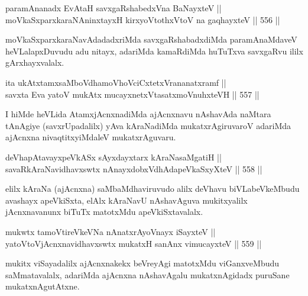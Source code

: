 \begin{shl}
paramAnanadx EvAtaH savxgaRshabedxVna BaNayxteV || \\
moVkaSxparxkaraNAninxtayxH kirxyoVtothxV\s toV na gaqhayxteV \hfill || 556 ||  
\end{shl}	

\begin{artha}
moVkaSxparxkaraNavAdadadxriMda savxgaRshabadxdiMda paramAnaMdaveV\break
heVLalapxDuvudu adu nitayx, adariMda kamaRdiMda huTuTxva savxgaRvu
ililx gArxhayxvalalx.
\end{artha}


\begin{shl}
ita ukAtxtamxsaMboVdhamoVhoVciCxtetxVrananatxramf || \\
savxta Eva yatoV mukAtx mucayxnetxV\s tasatxmoVnuhxteVH \hfill || 557 ||  
\end{shl}

\begin{artha}
I hiMde heVLida AtamxjAcnxnadiMda ajAcnxnavu nAshavAda naMtara
tAnAgiye (savxrUpadalilx) yAva kAraNadiMda mukatxrAgiruvaroV adariMda
ajAcnxna nivaqtitxyiMdaleV mukatxrAguvaru.
\end{artha}

\begin{shl}
deVhapAtavayxpeVkASx sAyxdayxtarx kAraNasaMgatiH || \\
savaRkAraNavidhavxswtx nAnayxdobxVdhAdapeVkaSxyXteV \hfill || 558 ||  
\end{shl}

\begin{artha}
elilx kAraNa (ajAcnxna) saMbaMdhaviruvudo alilx deVhavu
biVLabeVkeMbudu avashayx apeVkiSxta, elAlx kAraNavU nAshavAguva
mukitxyalilx jAcnxnavanunx biTuTx matotxMdu apeVkiSxtavalalx.
\end{artha}

\begin{shl}
mukwtx tamoVtireVkeVNa nAnatxrAyoV\s nayx iSayxteV || \\
yatoV\s toV\s jAcnxnavidhavxswtx mukatxH sanAnx vimucayxteV \hfill || 559 ||  
\end{shl}

\begin{artha}
mukitx viSayadalilx ajAcnxnakekx beVreyAgi matotxMdu viGanxveMbudu
saMmatavalalx, adariMda ajAcnxna nAshavAgalu mukatxnAgidadx puruSane mukatxnAgutAtxne.
\end{artha}

